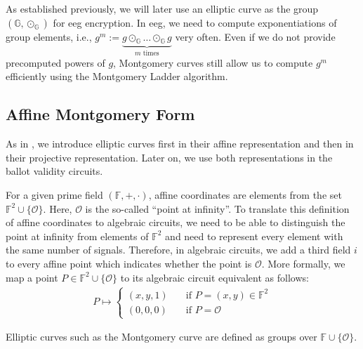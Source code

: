 As established previously, we will later use an elliptic curve as the group $(\mathbb{G}, \odot_{\mathbb{G}})$ for \gls{eeg} encryption.
In \gls{eeg}, we need to compute exponentiations of group elements, i.e., $g^m:=\underbrace{g\odot_{\mathbb{G}}\dots\odot_{\mathbb{G}}g}_{m \text{ times}}$ very often.
Even if we do not provide precomputed powers of $g$, Montgomery curves still allow us to compute $g^m$ efficiently using the Montgomery Ladder algorithm.

\subsection{Affine Montgomery Form}
As in \cite{least_authority_moonmath_2024}, we introduce elliptic curves first in their affine representation and then in their projective representation.
Later on, we use both representations in the ballot validity circuits.

For a given prime field $(\mathbb{F}, +, \cdot)$, affine coordinates are elements from the set $\mathbb{F}^2\cup\{\mathcal{O}\}$.
Here, $\mathcal{O}$ is the so-called ``point at infinity''.
To translate this definition of affine coordinates to algebraic circuits, we need to be able to distinguish the point at infinity from elements of $\mathbb{F}^2$ and need to represent every element with the same number of signals.
Therefore, in algebraic circuits, we add a third field $i$ to every affine point which indicates whether the point is $\mathcal{O}$.
More formally, we map a point $P\in \mathbb{F}^2\cup\{\mathcal{O}\}$ to its algebraic circuit equivalent as follows:
\begin{align*}
    P\mapsto\begin{cases}
        (x, y, 1)&\quad\text{if } P=(x,y)\in\mathbb{F}^2\\
        (0,0,0)&\quad\text{if } P=\mathcal{O}
    \end{cases}
\end{align*}

Elliptic curves such as the Montgomery curve are defined as groups over $\mathbb{F}\cup\{\mathcal{O}\}$.


